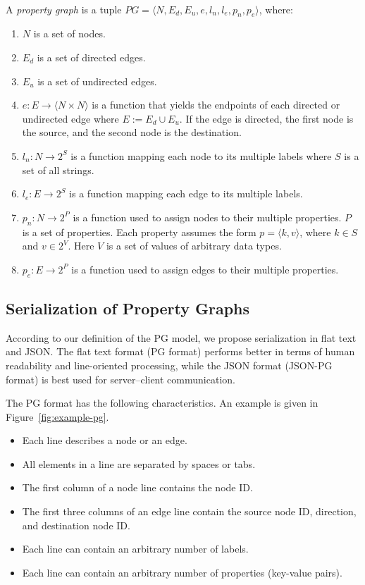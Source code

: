 \documentclass[runningheads]{llncs}
\begin{document}
\begin{defi}
\leavevmode \vspace{1mm} \\
A \emph{property graph} is a tuple
$PG = \langle N, E_d, E_u, e, l_n, l_e, p_n, p_e\rangle$, where:
\begin{enumerate}
    \item $N$ is a set of nodes.
    \item $E_d$ is a set of directed edges.
    \item $E_u$ is a set of undirected edges.
    \item $e: E \to \langle N \times N \rangle$ is a function that yields the endpoints of each directed or undirected edge where $E := E_d \cup E_u$. If the edge is directed, the first node is the source, and the second node is the destination.
    \item $l_n : N \to 2^S$ is a function mapping each node to its multiple labels where $S$ is a set of all strings.
    \item $l_e : E \to 2^S$ is a function mapping each edge to its multiple labels.
    \item $p_n : N \to 2^P$ is a function used to assign nodes to their multiple properties. $P$ is a set of properties. Each property assumes the form $p = \langle k,v \rangle$, where $k \in S$ and $v \in 2^V$. Here $V$ is a set of values of arbitrary data types.
    \item $p_e : E \to 2^P$ is a function used to assign edges to their multiple properties.
\end{enumerate}
\end{defi}


\subsection{Serialization of Property Graphs}
According to our definition of the PG model, we propose serialization in flat text and JSON. The flat text format (PG format) performs better in terms of human readability and line-oriented processing, while the JSON format (JSON-PG format) is best used for server--client communication.

The PG format has the following characteristics. An example is given in Figure~\ref{fig:example-pg}.

\begin{itemize}
    \item Each line describes a node or an edge.
    \item All elements in a line are separated by spaces or tabs.
    \item The first column of a node line contains the node ID.
    \item The first three columns of an edge line contain the source node ID, direction, and destination node ID.
    \item Each line can contain an arbitrary number of labels.
    \item Each line can contain an arbitrary number of properties (key-value pairs).
\end{itemize}
\end{document}
